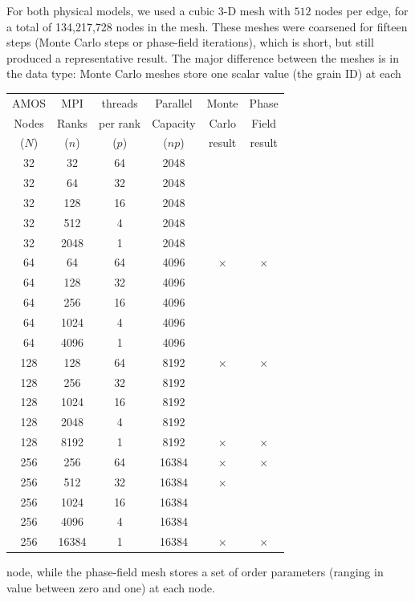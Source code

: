 \documentclass[11pt]{article}
\begin{document}
\begin{multicols*}{2}
For both physical models, we used a cubic 3-D mesh with $512$ nodes per edge, for a total of 134,217,728 nodes in the mesh.
These meshes were coarsened for fifteen steps (Monte Carlo steps or phase-field iterations), which is short, but still produced a representative result.
The major difference between the meshes is in the data type:
Monte Carlo meshes store one scalar value (the grain ID) at each
\begin{center}
\begin{minipage}{0.45\textwidth}\centering
{}
\begin{footnotesize}
\bgroup
\renewcommand\tabcolsep{5pt}
\begin{tabular}{|cccc|cc|}\hline
AMOS  	& MPI 	& threads & Parallel	& Monte	& Phase\\
Nodes	& Ranks & per rank & Capacity	& Carlo	& Field\\
($N$)	& ($n$)	& ($p$)	& ($np$)	& result & result\\\hline
32	& 32	& 64	& 2048	&\checkmark &\checkmark \\
32	& 64	& 32	& 2048	&\checkmark &\checkmark \\
32	& 128	& 16	& 2048	&\checkmark &\checkmark \\
32	& 512	& 4	& 2048	&\checkmark &\checkmark \\
32	& 2048	& 1	& 2048	&\checkmark &\checkmark \\\hline
64	& 64	& 64	& 4096	&$\times$ &$\times$ \\
64	& 128	& 32	& 4096	&\checkmark &\checkmark \\
64	& 256	& 16	& 4096	&\checkmark &\checkmark \\
64	& 1024	& 4	& 4096	&\checkmark &\checkmark \\
64	& 4096	& 1	& 4096	&\checkmark &\checkmark \\\hline
128	& 128	& 64	& 8192	&$\times$ &$\times$ \\
128	& 256	& 32	& 8192	&\checkmark &\checkmark \\
128	& 1024	& 16	& 8192	&\checkmark &\checkmark \\
128	& 2048	& 4	& 8192	&\checkmark &\checkmark \\
128	& 8192	& 1	& 8192	&$\times$ &$\times$ \\\hline
256	& 256	& 64	& 16384	&$\times$ &$\times$\\
256	& 512	& 32	& 16384	&$\times$ &\checkmark \\
256	& 1024	& 16	& 16384	&\checkmark &\checkmark \\
256	& 4096	& 4	& 16384	&\checkmark &\checkmark \\
256	& 16384	& 1	& 16384	&$\times$ &$\times$ \\\hline
\end{tabular}
\egroup
\end{footnotesize}
\end{minipage}
\end{center}
node, while the phase-field mesh stores a set of order parameters (ranging in value between zero and one) at each node.


\end{multicols*}
\end{document}
